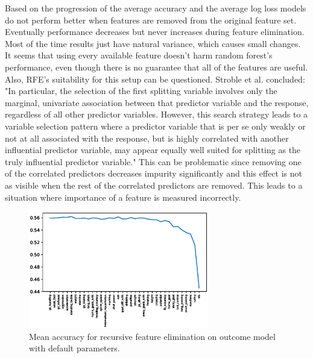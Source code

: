 Based on the progression of the average accuracy and the average log loss models do not perform better when features are removed from the original feature set. Eventually performance decreases but never increases during feature elimination. Most of the time results just have natural variance, which causes small changes. It seems that using every available feature doesn't harm random forest's performance, even though there is no guarantee that all of the features are useful. Also, RFE's suitability for this setup can be questioned. Stroble et al. concluded: "In particular, the selection of the first splitting variable involves only the marginal, univariate association between that predictor variable and the response, regardless of all other predictor variables. However, this search strategy leads to a variable selection pattern where a predictor variable that is per se only weakly or not at all associated with the response, but is highly correlated with another influential predictor variable, may appear equally well suited for splitting as the truly influential predictor variable." This can be problematic since removing one of the correlated predictors decreases impurity significantly and this effect is not as visible when the rest of the correlated predictors are removed. This leads to a situation where importance of a feature is measured incorrectly.
\begin{figure}[H]
    \centering
    \includegraphics[width=0.7\textwidth]{img/default_avg_accuracy.eps}
    \caption{Mean accuracy for recursive feature elimination on outcome model with default parameters.}
    \label{fig:def_avg_accu}
\end{figure}

